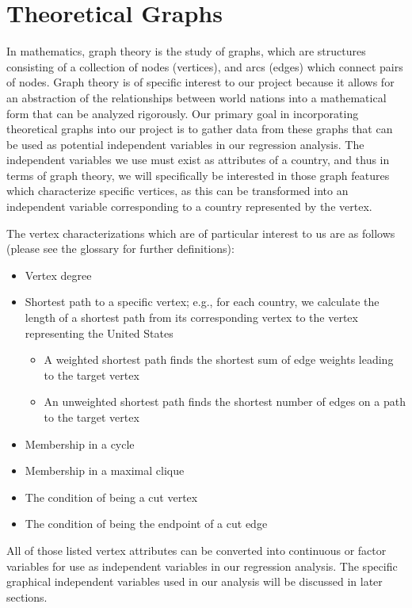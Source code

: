 \documentclass[oneside,12pt]{report}
\begin{document}
\section*{Theoretical Graphs}

In mathematics, graph theory is the study of graphs, which are structures consisting of a collection of nodes (vertices), and arcs (edges) which connect pairs of nodes. Graph theory is of specific interest to our project because it allows for an abstraction of the relationships between world nations into a mathematical form that can be analyzed rigorously. Our primary goal in incorporating theoretical graphs into our project is to gather data from these graphs that can be used as potential independent variables in our regression analysis. The independent variables we use must exist as attributes of a country, and thus in terms of graph theory, we will specifically be interested in those graph features which characterize specific vertices, as this can be transformed into an independent variable corresponding to a country represented by the vertex.

The vertex characterizations which are of particular interest to us are as follows (please see the glossary for further definitions):
\begin{itemize}
\item Vertex degree
\item Shortest path to a specific vertex; e.g., for each country, we calculate the length of a shortest path from its corresponding vertex to the vertex representing the United States
\begin{itemize}
\item A weighted shortest path finds the shortest sum of edge weights leading to the target vertex
\item An unweighted shortest path finds the shortest number of edges on a path to the target vertex
\end{itemize}
\item Membership in a cycle
\item Membership in a maximal clique
\item The condition of being a cut vertex
\item The condition of being the endpoint of a cut edge
\end{itemize}

All of those listed vertex attributes can be converted into continuous or factor variables for use as independent variables in our regression analysis. The specific graphical independent variables used in our analysis will be discussed in later sections.
\end{document}
